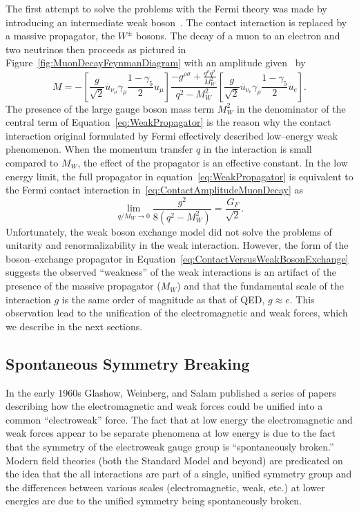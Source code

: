The first attempt to solve the problems with the Fermi theory was made by
introducing an intermediate weak boson~\cite{Glashow:1961tr}.  The contact
interaction is replaced by a massive propagator, the $W^\pm$ bosons.  The decay
of a muon to an electron and two neutrinos then proceeds as pictured in
Figure~\ref{fig:MuonDecayFeynmanDiagram} with an amplitude
given~\cite{Morii:SMandBSM} by
\begin{equation}
  M = - \left[\frac{g}{\sqrt{2}} \overline u_{\nu_\mu} \gamma_\rho \frac{1 -
  \gamma_5}{2} u_\mu\right] \frac{-g^{\rho\sigma} + \frac{q^\rho
  q^\sigma}{M_W^2}}{q^2 - M_W^2} 
  \left[\frac{g}{\sqrt{2}} \overline u_{\nu_e} \gamma_\rho \frac{1 -
  \gamma_5}{2} u_e\right].
  \label{eq:WeakPropagator}
\end{equation}
The presence of the large gauge boson mass term $M_W^2$ in the denominator of
the central term of Equation~\ref{eq:WeakPropagator} is the reason why the
contact interaction original formulated by Fermi effectively described 
low--energy weak phenomenon.  When the momentum transfer $q$ in the interaction
is small compared to $M_W$, the effect of the propagator is an effective
constant.  In the low energy limit, the full propagator in
equation~\ref{eq:WeakPropagator} is equivalent to the Fermi contact
interaction in~\ref{eq:ContactAmplitudeMuonDecay} as
\begin{equation}
  \lim_{q/M_W \to 0}\frac{g^2}{8(q^2-M^2_W)} = \frac{G_F}{\sqrt{2}}.
  \label{eq:ContactVersusWeakBosonExchange}
\end{equation}
Unfortunately, the weak boson exchange model did not solve the problems of
unitarity and renormalizability in the weak interaction.   However, the form of
the boson--exchange propagator in
Equation~\ref{eq:ContactVersusWeakBosonExchange} suggests the observed
``weakness'' of the weak interactions is an artifact of the presence of the
massive propagator ($M_W$) and that the fundamental scale of the interaction $g$
is the same order of magnitude as that of QED, $g \approx e$.  This observation
lead to the unification of the electromagnetic and weak forces, which we
describe in the next sections.

\subsection{Spontaneous Symmetry Breaking}
\label{sec:SSB}
In the early 1960s Glashow, Weinberg, and Salam published a series of papers
describing how the electromagnetic and weak forces could be unified into a
common ``electroweak'' force.  The fact that at low energy the electromagnetic
and weak forces appear to be separate phenomena at low energy is due to the fact that the
symmetry of the electroweak gauge group is ``spontaneously broken.''  Modern
field theories (both the Standard Model and beyond) are predicated on the idea
that the all interactions are part of a single, unified symmetry group and the 
differences between various scales (electromagnetic, weak, etc.) at lower
energies are due to the unified symmetry being spontaneously broken.

